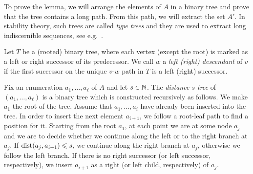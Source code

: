 

To prove the lemma, we will arrange the elements of $A$ in a binary tree
and prove that the tree contains a long path. From this path, we will 
extract the set $A'$. In stability theory, such trees are called \emph{type trees} and they are used to extract long indiscernible sequences, see e.g.~\cite{malliaris2014regularity}. 

Let $T$ be a (rooted) binary tree, where each vertex (except the root) is 
marked as a left or right successor of its predecessor. We call $w$ 
a \emph{left (right) descendant} of $v$ if the first successor on the unique
$v$-$w$ path in $T$ is a left (right) successor.

Fix an enumeration $a_1,\ldots, a_{\ell}$ of $A$ and let $s\in \mathbb{N}$. 
The \emph{distance-$s$ tree}
of $(a_1,\ldots,a_{\ell})$ is a binary tree which is constructed recursively as 
follows. We make $a_1$ the root of the tree. Assume that $a_1,\ldots, a_i$
have already been inserted into the tree. In order to insert the next element $a_{i+1}$, we follow a root-leaf path to find a position for it. 
Starting from the root $a_1$, at each point we are at some node $a_j$ and we are to decide whether we continue along the left or to the right branch at $a_j$.
If $\mathrm{dist}(a_j,a_{i+1})\leqslant s$, we continue along the right branch at $a_j$, otherwise we follow the left branch. If 
there is no right successor (or left successor, respectively), we insert $a_{i+1}$ 
as a right (or left child, respectively) of $a_j$. 

